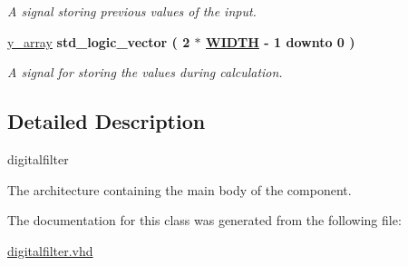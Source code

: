 \begin{DoxyCompactItemize}
\begin{DoxyCompactList}\small\item\em A signal storing previous values of the input. \end{DoxyCompactList}\item 
\hypertarget{classdigitalfilter_1_1FIR__filter_a9262635bb1afdde0b36bc6d7cdea4972}{\hyperlink{classdigitalfilter_1_1FIR__filter_a9262635bb1afdde0b36bc6d7cdea4972}{y\-\_\-array} {\bfseries \textcolor{comment}{std\-\_\-logic\-\_\-vector}\textcolor{vhdlchar}{ }\textcolor{vhdlchar}{(}\textcolor{vhdlchar}{ }\textcolor{vhdlchar}{ } \textcolor{vhdldigit}{2} \textcolor{vhdlchar}{ }\textcolor{vhdlchar}{$\ast$}\textcolor{vhdlchar}{ }{\bfseries \hyperlink{classdigitalfilter_a91fcbc2cb8dd91f914c30526e23794a9}{W\-I\-D\-T\-H}} \textcolor{vhdlchar}{ }\textcolor{vhdlchar}{-\/}\textcolor{vhdlchar}{ } \textcolor{vhdldigit}{1} \textcolor{vhdlchar}{ }\textcolor{vhdlchar}{ }\textcolor{vhdlchar}{ }\textcolor{vhdlkeyword}{downto}\textcolor{vhdlchar}{ }\textcolor{vhdlchar}{ }\textcolor{vhdlchar}{ } \textcolor{vhdldigit}{0} \textcolor{vhdlchar}{ }\textcolor{vhdlchar}{)}\textcolor{vhdlchar}{ }} }\label{classdigitalfilter_1_1FIR__filter_a9262635bb1afdde0b36bc6d7cdea4972}

\begin{DoxyCompactList}\small\item\em A signal for storing the values during calculation. \end{DoxyCompactList}\end{DoxyCompactItemize}


\subsection{Detailed Description}
digitalfilter 

The architecture containing the main body of the component. 

The documentation for this class was generated from the following file\-:\begin{DoxyCompactItemize}
\item 
\hyperlink{digitalfilter_8vhd}{digitalfilter.\-vhd}\end{DoxyCompactItemize}
